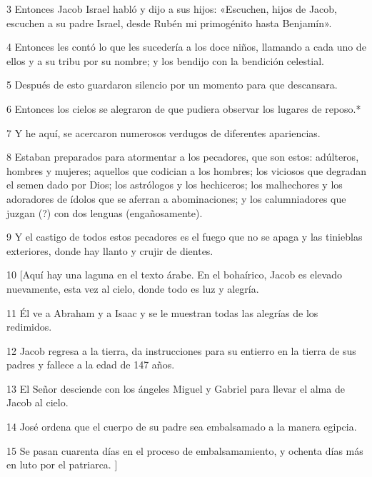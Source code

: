 \par 3 Entonces Jacob Israel habló y dijo a sus hijos: «Escuchen, hijos de Jacob, escuchen a su padre Israel, desde Rubén mi primogénito hasta Benjamín».

\par 4 Entonces les contó lo que les sucedería a los doce niños, llamando a cada uno de ellos y a su tribu por su nombre; y los bendijo con la bendición celestial.

\par 5 Después de esto guardaron silencio por un momento para que descansara.

\par 6 Entonces los cielos se alegraron de que pudiera observar los lugares de reposo.*

\par 7 Y he aquí, se acercaron numerosos verdugos de diferentes apariencias.

\par 8 Estaban preparados para atormentar a los pecadores, que son estos: adúlteros, hombres y mujeres; aquellos que codician a los hombres; los viciosos que degradan el semen dado por Dios; los astrólogos y los hechiceros; los malhechores y los adoradores de ídolos que se aferran a abominaciones; y los calumniadores que juzgan (?) con dos lenguas (engañosamente).

\par 9 Y el castigo de todos estos pecadores es el fuego que no se apaga y las tinieblas exteriores, donde hay llanto y crujir de dientes.

\par 10 [Aquí hay una laguna en el texto árabe. En el bohaírico, Jacob es elevado nuevamente, esta vez al cielo, donde todo es luz y alegría.

\par 11 Él ve a Abraham y a Isaac y se le muestran todas las alegrías de los redimidos.

\par 12 Jacob regresa a la tierra, da instrucciones para su entierro en la tierra de sus padres y fallece a la edad de 147 años.

\par 13 El Señor desciende con los ángeles Miguel y Gabriel para llevar el alma de Jacob al cielo.

\par 14 José ordena que el cuerpo de su padre sea embalsamado a la manera egipcia.

\par 15 Se pasan cuarenta días en el proceso de embalsamamiento, y ochenta días más en luto por el patriarca. ]

